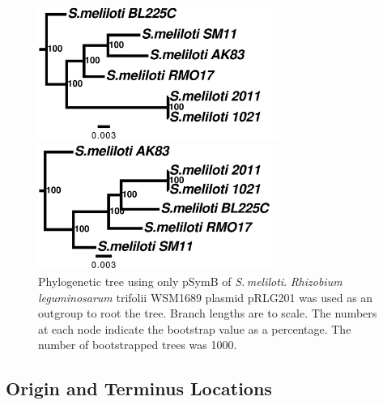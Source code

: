 \documentclass[11pt]{article}
\newcommand{\smel}{\textit{S.\,meliloti}\xspace}
\newcommand{\rleg}{\textit{Rhizobium leguminosarum}\xspace}
\begin{document}
		\begin{figure}
		\begin{center}
			\includegraphics[width=0.7\textwidth]{./figs/pSymA_chrom_figtree_raw_29Aug20.pdf}
			\caption{\label{fig:sinoPAtree} Phylogenetic tree using only pSymA of \smel. \rleg trifolii WSM1689 plasmid pRLG202 was used as an outgroup to root the tree. Branch lengths are to scale. The numbers at each node indicate the bootstrap value as a percentage. The number of bootstrapped trees was 1000.}
		\end{center}
		\vspace*{\floatsep}%
			\begin{center}
				
				\includegraphics[width=0.7\textwidth]{./figs/pSymB_chrom_figtree_raw_29Aug20.pdf}
				\caption{\label{fig:sinoPBtree} Phylogenetic tree using only pSymB of \smel. \rleg trifolii WSM1689 plasmid pRLG201 was used as an outgroup to root the tree. Branch lengths are to scale. The numbers at each node indicate the bootstrap value as a percentage. The number of bootstrapped trees was 1000.}
			\end{center}
		\end{figure}
	

	
	\subsection{Origin and Terminus Locations}
\end{document}
